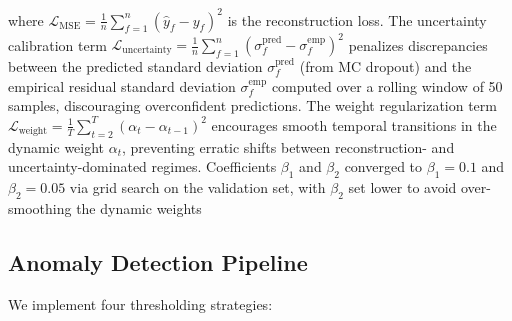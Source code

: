 where $\mathcal{L}_{\text{MSE}} = \frac{1}{n}\sum_{f=1}^{n} (\hat{y}_f - y_f)^2$ is the reconstruction loss. The uncertainty calibration term $\mathcal{L}_{\text{uncertainty}} = \frac{1}{n}\sum_{f=1}^{n} (\sigma_f^{\text{pred}} - \sigma_f^{\text{emp}})^2$ penalizes discrepancies between the predicted standard deviation $\sigma_f^{\text{pred}}$ (from MC dropout) and the empirical residual standard deviation $\sigma_f^{\text{emp}}$ computed over a rolling window of 50 samples, discouraging overconfident predictions. The weight regularization term $\mathcal{L}_{\text{weight}} = \frac{1}{T}\sum_{t=2}^{T} (\alpha_t - \alpha_{t-1})^2$ encourages smooth temporal transitions in the dynamic weight $\alpha_t$, preventing erratic shifts between reconstruction- and uncertainty-dominated regimes. Coefficients $\beta_1$ and $\beta_2$ converged to $\beta_1 = 0.1$ and $\beta_2 = 0.05$ via grid search on the validation set, with $\beta_2$ set lower to avoid over-smoothing the dynamic weights

\subsection{Anomaly Detection Pipeline}

We implement four thresholding strategies:

